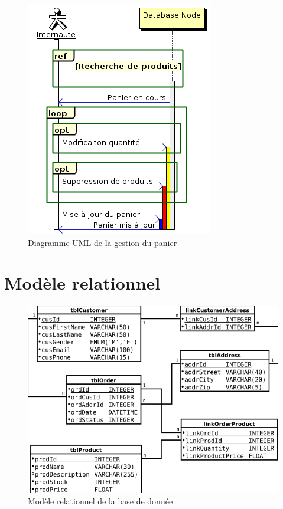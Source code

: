 \documentclass[12pt]{article}
\begin{document}
\begin{figure}[ht]
    \center
    \includegraphics[scale=0.7]{../Diagrams/SequenceDiagrams/panier.png}
    \caption*{Diagramme UML de la gestion du panier}
\end{figure}

\newpage
\section{Modèle relationnel}

\begin{figure}[ht]
    \center
    \includegraphics[scale=0.7]{../Diagrams/ClassDiagrams/Database.png}
    \caption*{Modèle relationnel de la base de donnée}
\end{figure}
\end{document}
